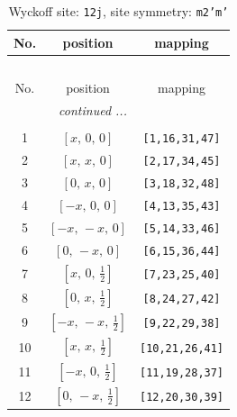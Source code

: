 \documentclass[fleqn,8pt]{jsarticle}
\begin{document}
\begin{longtable}{ccc}
\caption{Wyckoff site: {\tt 12j}, site symmetry: {\tt m2'm'}}
 \\
 \hline \hline
No. & position & mapping \\ \hline \endfirsthead

\multicolumn{2}{l}{\tablename\ \thetable{}} \\
 \hline \hline
No. & position & mapping \\ \hline \endhead

 \hline \hline
\multicolumn{2}{r}{\footnotesize\it continued ...} \\ \endfoot

 \hline \hline
\multicolumn{2}{r}{} \\ \endlastfoot

1 & $\left[ x,\, 0,\, 0 \right]$ & {\tt [1,16,31,47]} \\ \hline
2 & $\left[ x,\, x,\, 0 \right]$ & {\tt [2,17,34,45]} \\ \hline
3 & $\left[ 0,\, x,\, 0 \right]$ & {\tt [3,18,32,48]} \\ \hline
4 & $\left[ - x,\, 0,\, 0 \right]$ & {\tt [4,13,35,43]} \\ \hline
5 & $\left[ - x,\, - x,\, 0 \right]$ & {\tt [5,14,33,46]} \\ \hline
6 & $\left[ 0,\, - x,\, 0 \right]$ & {\tt [6,15,36,44]} \\ \hline
7 & $\left[ x,\, 0,\, \frac{1}{2} \right]$ & {\tt [7,23,25,40]} \\ \hline
8 & $\left[ 0,\, x,\, \frac{1}{2} \right]$ & {\tt [8,24,27,42]} \\ \hline
9 & $\left[ - x,\, - x,\, \frac{1}{2} \right]$ & {\tt [9,22,29,38]} \\ \hline
10 & $\left[ x,\, x,\, \frac{1}{2} \right]$ & {\tt [10,21,26,41]} \\ \hline
11 & $\left[ - x,\, 0,\, \frac{1}{2} \right]$ & {\tt [11,19,28,37]} \\ \hline
12 & $\left[ 0,\, - x,\, \frac{1}{2} \right]$ & {\tt [12,20,30,39]} \\
\end{longtable}
\renewcommand{\arraystretch}{1.2}
\end{document}
